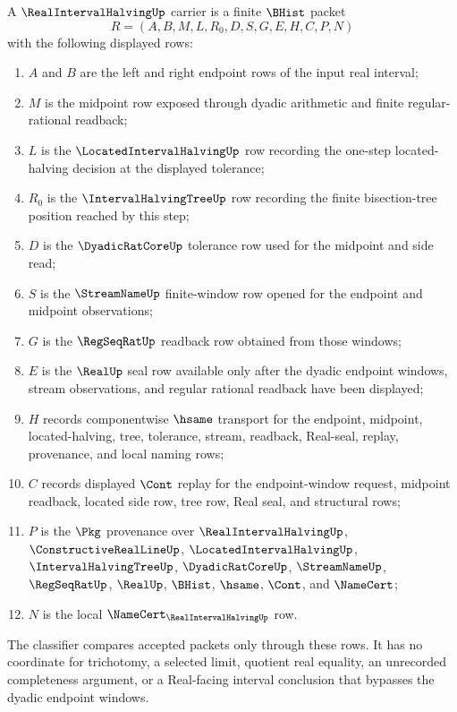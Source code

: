 \begin{definition}
\label{def:real-interval-halving-carrier}
A $\RealIntervalHalvingUp$ carrier is a finite $\BHist$ packet
$$
R=(A,B,M,L,R_{0},D,S,G,E,H,C,P,N)
$$
with the following displayed rows:
\begin{enumerate}
\item $A$ and $B$ are the left and right endpoint rows of the input real interval;
\item $M$ is the midpoint row exposed through dyadic arithmetic and finite regular-rational readback;
\item $L$ is the $\LocatedIntervalHalvingUp$ row recording the one-step located-halving decision at the displayed tolerance;
\item $R_{0}$ is the $\IntervalHalvingTreeUp$ row recording the finite bisection-tree position reached by this step;
\item $D$ is the $\DyadicRatCoreUp$ tolerance row used for the midpoint and side read;
\item $S$ is the $\StreamNameUp$ finite-window row opened for the endpoint and midpoint observations;
\item $G$ is the $\RegSeqRatUp$ readback row obtained from those windows;
\item $E$ is the $\RealUp$ seal row available only after the dyadic endpoint windows, stream observations, and regular rational readback have been displayed;
\item $H$ records componentwise $\hsame$ transport for the endpoint, midpoint, located-halving, tree, tolerance, stream, readback, Real-seal, replay, provenance, and local naming rows;
\item $C$ records displayed $\Cont$ replay for the endpoint-window request, midpoint readback, located side row, tree row, Real seal, and structural rows;
\item $P$ is the $\Pkg$ provenance over $\RealIntervalHalvingUp$, $\ConstructiveRealLineUp$, $\LocatedIntervalHalvingUp$, $\IntervalHalvingTreeUp$, $\DyadicRatCoreUp$, $\StreamNameUp$, $\RegSeqRatUp$, $\RealUp$, $\BHist$, $\hsame$, $\Cont$, and $\NameCert$;
\item $N$ is the local $\NameCert_{\RealIntervalHalvingUp}$ row.
\end{enumerate}
The classifier compares accepted packets only through these rows. It has no coordinate for trichotomy, a selected limit, quotient real equality, an unrecorded completeness argument, or a Real-facing interval conclusion that bypasses the dyadic endpoint windows.
\end{definition}

